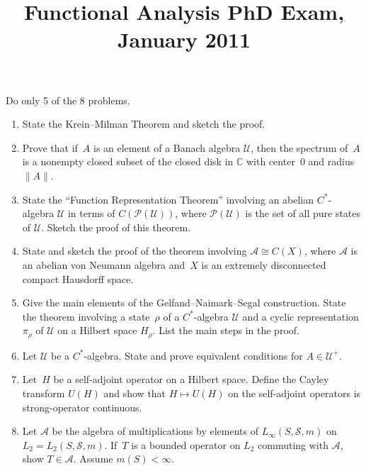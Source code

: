 \documentclass[11pt,letterpaper]{article}
\title{Functional Analysis PhD Exam, January 2011}
\author{}
\date{}
\newenvironment{examproblems}[2]{%
  \def\ProblemHeadingTag{#2}%
  \AssignTaggingSocketPlug{block/list/label}{examproblem}%
  \begin{enumerate}%
  \setcounter{enumi}{#1}%
  \renewcommand{\labelenumi}{\textbf{\theenumi.}}%
  \setlength{\topsep}{0.35em}%
  \setlength{\partopsep}{0pt}%
  \setlength{\itemsep}{0.48em}%
  \setlength{\parsep}{0.18em}%
}{\end{enumerate}}
\newenvironment{examinstructions}{%
  \par\begingroup\itshape
}{%
  \par\endgroup\vspace{0.18em}
}
\begin{document}
\maketitle
\thispagestyle{empty}
\begin{examinstructions}
Do only 5 of the 8 problems.
\end{examinstructions}
\begin{examproblems}{0}{H2}
\def\ProblemHeadingText{Problem 1.}
\item
State the Krein–Milman Theorem and sketch the proof.
\def\ProblemHeadingText{Problem 2.}
\item
Prove that if~\(A\) is an element of a Banach algebra \(\mathcal U\), then the spectrum of~\(A\) is a nonempty closed subset of the closed disk in \(\mathbb C\) with center~\(0\) and radius \(\lVert A\rVert\).
\def\ProblemHeadingText{Problem 3.}
\item
State the “Function Representation Theorem” involving an abelian \(C^*\)-algebra \(\mathcal U\) in terms of \(C(\mathcal P(\mathcal U))\), where \(\mathcal P(\mathcal U)\) is the set of all pure states of \(\mathcal U\). Sketch the proof of this theorem.
\def\ProblemHeadingText{Problem 4.}
\item
State and sketch the proof of the theorem involving \(\mathcal A\cong C(X)\), where \(\mathcal A\) is an abelian von Neumann algebra and~\(X\) is an extremely disconnected compact Hausdorff space.
\def\ProblemHeadingText{Problem 5.}
\item
Give the main elements of the Gelfand–Naimark–Segal construction. State the theorem involving a state~\(\rho\) of a \(C^*\)-algebra \(\mathcal U\) and a cyclic representation \(\pi_\rho\) of \(\mathcal U\) on a Hilbert space \(H_\rho\). List the main steps in the proof.
\def\ProblemHeadingText{Problem 6.}
\item
Let \(\mathcal U\) be a \(C^*\)-algebra. State and prove equivalent conditions for \(A\in\mathcal U^+\).
\def\ProblemHeadingText{Problem 7.}
\item
Let~\(H\) be a self-adjoint operator on a Hilbert space. Define the Cayley transform \(U(H)\) and show that \(H\mapsto U(H)\) on the self-adjoint operators is strong-operator continuous.
\def\ProblemHeadingText{Problem 8.}
\item
Let \(\mathcal A\) be the algebra of multiplications by elements of \(L_\infty(S,\mathcal S,m)\) on \(L_2=L_2(S,\mathcal S,m)\). If~\(T\) is a bounded operator on \(L_2\) commuting with \(\mathcal A\), show \(T\in\mathcal A\). Assume \(m(S)<\infty\).
\end{examproblems}
\end{document}
